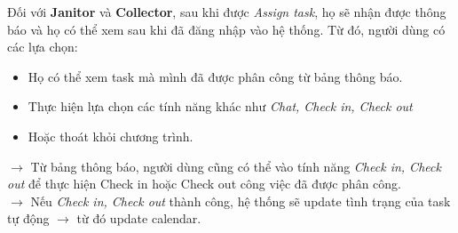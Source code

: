 \documentclass[a4paper]{article}
\begin{document}
    Đối với \textbf{Janitor} và \textbf{Collector}, sau khi được \textit{Assign task}, họ sẽ nhận được thông báo và họ có thể xem sau khi đã đăng nhập vào hệ thống. Từ đó, người dùng có các lựa chọn:
    \begin{itemize}
        \item Họ có thể xem task mà mình đã được phân công từ bảng thông báo.
        \item Thực hiện lựa chọn các tính năng khác như \textit{Chat, Check in, Check out}
        \item Hoặc thoát khỏi chương trình.
    \end{itemize}
    $\rightarrow$ Từ bảng thông báo, người dùng cũng có thể vào tính năng \textit{Check in, Check out} để thực hiện Check in hoặc Check out công việc đã được phân công.\\
    $\rightarrow$  Nếu \textit{Check in, Check out} thành công, hệ thống sẽ update tình trạng của task tự động $\rightarrow$ từ đó update calendar.
\end{document}
